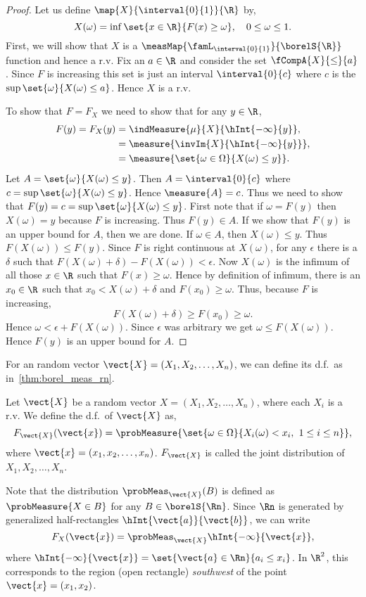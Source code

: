 \begin{proof}
    Let us define $\map{X}{\interval{0}{1}}{\R}$ by,
    \[X(\omega) = \inf\set{x\in\R}{F(x)\geq \omega},\quad 0\leq\omega\leq 1.\]
    First, we will show that $X$ is a $\measMap{\famL_{\interval{0}{1}}}{\borelS{\R}}$ function and hence a 
    r.v. Fix an $a \in \R$ and consider the set $\fCompA{X}{\leq}{a}$. Since $F$ is increasing this set is
    just an interval $\interval{0}{c}$ where $c$ is the $\sup\set{\omega}{X(\omega)\leq a}$. Hence $X$ is a r.v.

    To show that $F = F_X$ we need to show that for any $y\in \R$,
    \begin{align*}
	F(y) = F_X(y) &= \indMeasure{\mu}{X}{\hInt{-\infty}{y}},\\
	& = \measure{\invIm{X}{\hInt{-\infty}{y}}},\\
	& = \measure{\set{\omega\in\Omega}{X(\omega)\leq y}}.
    \end{align*}
    Let $A = \set{\omega}{X(\omega)\leq y}$. Then $A = \interval{0}{c}$ where 
    $c = \sup\set{\omega}{X(\omega)\leq y}$. Hence $\measure{A} = c$. Thus we need
    to show that $F(y) = c = \sup\set{\omega}{X(\omega)\leq y}$.
    First note that if $\omega = F(y)$ then $X(\omega) = y$ because $F$ is increasing. Thus $F(y) \in A$. If
    we show that $F(y)$ is an upper bound for $A$, then we are done. If $\omega \in A$, then $X(\omega) \leq
    y$. Thus $F(X(\omega)) \leq F(y)$. Since $F$ is right continuous at $X(\omega)$, for any $\epsilon$ there
    is a $\delta$ such that $F(X(\omega) + \delta) - F(X(\omega)) < \epsilon$. Now $X(\omega)$ is the infimum
    of all those $x \in \R$ such that $F(x) \geq \omega$. Hence by definition of infimum, 
    there is an $x_0 \in\R$ such that $x_0 <
    X(\omega) + \delta$ and $F(x_0) \geq \omega$. Thus, because $F$ is increasing,
    \[F(X(\omega)+\delta) \geq F(x_0) \geq \omega.\]
    Hence $\omega < \epsilon + F(X(\omega))$. Since $\epsilon$ was arbitrary we get $\omega \leq
    F(X(\omega))$. Hence $F(y)$ is an upper bound for $A$.
\end{proof}
For an random vector $\vect{X} = (X_1,X_2,\dots,X_n)$, we can define its d.f.~as in~\ref{thm:borel_meas_rn}.
\begin{Definition}[name=Joint Distribution]
    Let $\vect{X}$ be a random vector $X = (X_1,X_2,\dots,X_n)$, where each $X_i$ is a r.v. We define the
    d.f.~of $\vect{X}$ as,
    \[F_{\vect{X}}(\vect{x}) = 
	\probMeasure{\set{\omega\in\Omega}{X_i(\omega) < x_i,\hspace{0.05in}1\leq i \leq n}},\]
    where $\vect{x} = (x_1,x_2,\dots,x_n)$. $F_{\vect{X}}$ is called the joint distribution of
    $X_1,X_2,\dots,X_n$.
\end{Definition}
Note that the distribution $\probMeas_{\vect{X}}(B)$ is defined as $\probMeasure{X \in B}$ for any $B \in
\borelS{\Rn}$. Since $\Rn$ is generated by generalized half-rectangles $\hInt{\vect{a}}{\vect{b}}$, we can
write
\[F_X(\vect{x}) = \probMeas_{\vect{X}}{\hInt{-\infty}{\vect{x}}},\]
where $\hInt{-\infty}{\vect{x}} = \set{\vect{a}\in\Rn}{a_i \leq x_i}$. In $\R^2$, this corresponds to the
region (open rectangle) \emph{southwest} of the point $\vect{x} = (x_1,x_2)$.
